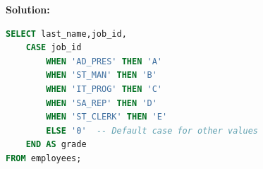 \documentclass[a4paper,12pt]{article}
\begin{document}
\begin{enumerate}
    \textbf{Solution: }
    \begin{lstlisting}[language=SQL]
SELECT last_name,job_id,
    CASE job_id
        WHEN 'AD_PRES' THEN 'A'
        WHEN 'ST_MAN' THEN 'B'
        WHEN 'IT_PROG' THEN 'C'
        WHEN 'SA_REP' THEN 'D'
        WHEN 'ST_CLERK' THEN 'E'
        ELSE '0'  -- Default case for other values
    END AS grade
FROM employees;

    \end{lstlisting}
\end{enumerate}
\end{document}
